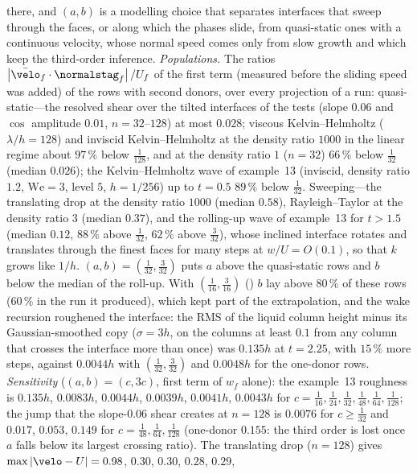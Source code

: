 there, and $(a,b)$ is a modelling choice that separates interfaces that sweep
through the faces, or along which the phases slide, from quasi-static ones
with a continuous velocity, whose normal speed comes only from slow growth
and which keep the third-order inference. \emph{Populations.} The ratios
$\abs{\bar{\velo}_f\cdot\normalstag_f}/U_f$ of the first term (measured before
the sliding speed was added) of the rows with second donors, over every
projection of a run: quasi-static---the resolved shear over the tilted
interfaces of the tests (slope $0.06$ and $\cos$ amplitude $0.01$,
$n=32$--$128$) at most $0.028$; viscous Kelvin--Helmholtz ($\lambda/h=128$)
and inviscid Kelvin--Helmholtz at the density ratio $1000$ in the linear
regime about $97\,\%$ below $\frac1{128}$, and at the density ratio $1$
($n=32$) $66\,\%$ below $\frac1{32}$ (median $0.026$); the Kelvin--Helmholtz
wave of example~13 (inviscid, density ratio $1.2$, $\mathrm{We}=3$, level $5$,
$h=1/256$) up to $t=0.5$ $89\,\%$ below $\frac1{32}$. Sweeping---the
translating drop at the density ratio $1000$ (median $0.58$),
Rayleigh--Taylor at the density ratio $3$ (median $0.37$), and the rolling-up
wave of example~13 for $t>1.5$ (median $0.12$, $88\,\%$ above $\frac1{32}$,
$62\,\%$ above $\frac3{32}$), whose inclined interface rotates and translates
through the finest faces for many steps at $w/U=O(0.1)$, so that $k$ grows
like $1/h$. $(a,b)=(\frac1{32},\frac3{32})$ puts $a$ above the quasi-static
rows and $b$ below the median of the roll-up. With $(\frac1{16},\frac3{16})$
() $b$ lay above $80\,\%$ of these rows ($60\,\%$ in the run it
produced), which kept part of the extrapolation, and the wake recursion
roughened the interface: the RMS of the liquid column
height minus its Gaussian-smoothed copy ($\sigma=3h$, on the columns at least
$0.1$ from any column that crosses the interface more than once) was $0.135h$
at $t=2.25$, with $15\,\%$ more steps, against $0.0044h$ with $(\frac1{32},\frac3{32})$ and $0.0048h$ for
the one-donor rows. \emph{Sensitivity} ($(a,b)=(c,3c)$, first term of $w_f$ alone): the example~13
roughness is $0.135h$, $0.0083h$, $0.0044h$, $0.0039h$, $0.0041h$, $0.0043h$
for $c=\frac1{16},\frac1{24},\frac1{32},\frac1{48},\frac1{64},\frac1{128}$;
the jump that the slope-$0.06$ shear creates at $n=128$ is $0.0076$ for
$c\ge\frac1{32}$ and $0.017$, $0.053$, $0.149$ for
$c=\frac1{48},\frac1{64},\frac1{128}$ (one-donor $0.155$: the third order is
lost once $a$ falls below its largest crossing ratio). The translating drop
($n=128$) gives $\max\abs{\velo-U}=0.98$, $0.30$, $0.30$, $0.28$, $0.29$,
